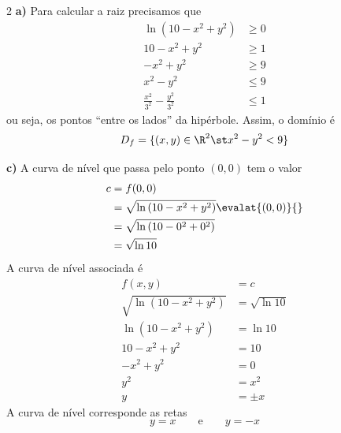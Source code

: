 \documentclass[a4paper,12pt,fleqn]{article}
\begin{document}
\begin{answer}
\begin{multicols}{2}
  \textbf{a)} \quad
  Para calcular a raiz precisamos que
  \begin{align*}
    \ln\left(10-x^2+y^2\right)        & \geq 0 \\
    10-x^2+y^2                        & \geq 1 \\
    -x^2+y^2                          & \geq 9 \\
    x^2 - y^2                         & \leq 9 \\
    \frac{x^2}{3^2} - \frac{y^2}{3^2} & \leq 1
  \end{align*}
  ou seja, os pontos ``entre os lados'' da hipérbole.
  Assim, o domínio é
  \[
    D_f = \{(x, y) \in \R^2 \st x^2 - y^2 < 9\}
  \]

  \bigskip
  \textbf{c)} \quad
  A curva de nível que passa pelo ponto $(0, 0)$ tem o valor
  \begin{align*}
    c
    & = f(0, 0) \\
    & = \sqrt{\ln\left(10 -x^2 +y^2 \right)} \evalat{(0, 0)}{} \\
    & = \sqrt{\ln\left(10 -0^2 +0^2 \right)} \\
    & = \sqrt{\ln 10}
  \end{align*}
  A curva de nível associada é
  \begin{align*}
    f(x, y)                           & = c             \\[2mm]
    \sqrt{\ln\left(10-x^2+y^2\right)} & = \sqrt{\ln 10} \\[2mm]
    \ln\left(10-x^2+y^2\right)        & = \ln 10        \\[2mm]
    10 - x^2 + y^2                    & = 10            \\[2mm]
    - x^2 + y^2                       & = 0             \\[2mm]
    y^2                               & = x^2           \\[2mm]
    y                                 & = \pm x
  \end{align*}
  A curva de nível corresponde as retas
  \[
    y = x
    \qquad\text{e}\qquad
    y = -x
  \]
\end{multicols}
\end{answer}

\end{document}
